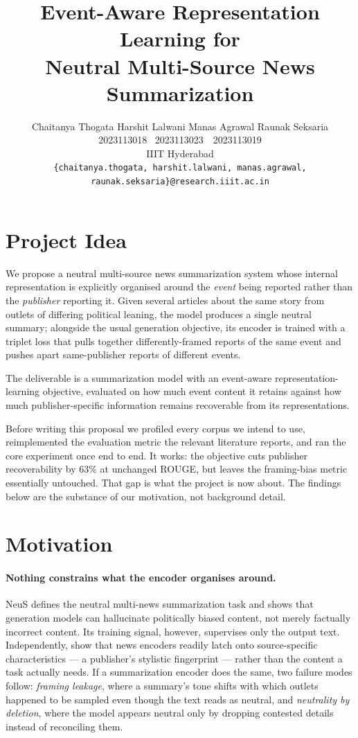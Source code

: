 \documentclass[10pt,twocolumn,a4paper]{article}
\title{\vspace{-1.2cm}\textbf{Event-Aware Representation Learning for\\
Neutral Multi-Source News Summarization}\vspace{-0.2cm}}
\author{
Chaitanya Thogata \quad Harshit Lalwani \quad Manas Agrawal \quad Raunak Seksaria \\
\small 2023113018 \quad\quad 2023111028 \quad\quad\, 2023113023 \quad\quad\,\, 2023113019 \\
\small IIIT Hyderabad \\
\small \texttt{\{chaitanya.thogata, harshit.lalwani, manas.agrawal, raunak.seksaria\}@research.iiit.ac.in}
}
\date{}
\begin{document}
\maketitle

\section{Project Idea}

We propose a neutral multi-source news summarization system whose internal
representation is explicitly organised around the \emph{event} being reported
rather than the \emph{publisher} reporting it. Given several articles about the
same story from outlets of differing political leaning, the model produces a
single neutral summary; alongside the usual generation objective, its encoder is
trained with a triplet loss that pulls together differently-framed reports of the
same event and pushes apart same-publisher reports of different events.

The deliverable is a summarization model with an event-aware
representation-learning objective, evaluated on how much event content it
retains against how much publisher-specific information remains recoverable from
its representations.

Before writing this proposal we profiled every corpus we intend to use,
reimplemented the evaluation metric the relevant literature reports, and ran the
core experiment once end to end. It works: the objective cuts publisher
recoverability by $63\%$ at unchanged ROUGE, but leaves the framing-bias metric
essentially untouched. That gap is what the project is now about. The findings
below are the substance of our motivation, not background detail.

\section{Motivation}

\paragraph{Nothing constrains what the encoder organises around.}
NeuS \cite{lee2022neus} defines the neutral multi-news summarization task and
shows that generation models can hallucinate politically biased content, not
merely factually incorrect content. Its training signal, however, supervises only
the output text. Independently, \citet{baly2020detect} show that news encoders
readily latch onto source-specific characteristics --- a publisher's stylistic
fingerprint --- rather than the content a task actually needs. If a
summarization encoder does the same, two failure modes follow: \emph{framing
leakage}, where a summary's tone shifts with which outlets happened to be
sampled even though the text reads as neutral, and \emph{neutrality by
deletion}, where the model appears neutral only by dropping contested details
instead of reconciling them.
\end{document}
